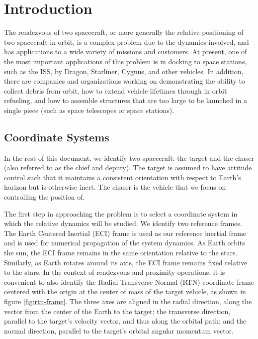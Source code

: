 \documentclass[conference]{IEEEtran}
\begin{document}

\section{Introduction}

The rendezvous of two spacecraft, or more generally the relative positioning of
two spacecraft in orbit, is a complex problem due to the dynamics involved, and
has applications to a wide variety of missions and customers. At present, one
of the most important applications of this problem is in docking to space
stations, such as the ISS, by Dragon, Starliner, Cygnus, and other vehicles.
In addition, there are companies and organizations working on demonstrating the
ability to collect debris from orbit, how to extend vehicle lifetimes through
in orbit refueling, and how to assemble structures that are too large to be
launched in a single piece (such as space telescopes or space stations).


\subsection{Coordinate Systems}


In the rest of this document, we identify two spacecraft: the target and the
chaser (also referred to as the chief and deputy). The target is assumed to
have attitude control such that it maintains a consistent orientation with
respect to Earth's horizon but is otherwise inert. The chaser is the vehicle
that we focus on controlling the position of.

The first step in approaching the problem is to select a coordinate system in
which the relative dynamics will be studied. We identify two reference frames.
The Earth Centered Inertial (ECI) frame \cite{eci_frame} is used as our
reference inertial frame and is used for numerical propagation of the system
dynamics. As Earth orbits the sun, the ECI frame remains in the same
orientation relative to the stars. Similarly, as Earth rotates around its axis,
the ECI frame remains fixed relative to the stars. In the context of rendezvous
and proximity operations, it is convenient to also identify the
Radial-Transverse-Normal (RTN) coordinate frame centered with the origin at the
center of mass of the target vehicle, as shown in figure \ref{fig:rtn-frame}.
The three axes are aligned in the radial direction, along the vector from the
center of the Earth to the target; the transverse direction, parallel to the
target's velocity vector, and thus along the orbital path; and the normal
direction, parallel to the target's orbital angular momentum vector.
\end{document}
